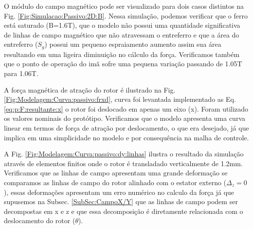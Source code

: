  O módulo do campo magnético pode ser visualizado para dois casos distintos na Fig. \ref{Fig:Simulacao:Passivo:2D:B}. Nessa simulação, podemos verificar que o ferro está saturado (B=1.6T), que o modelo não possui uma quantidade significativa de linhas de campo magnético que não atravessam o entreferro e que a área do entreferro ($S_g$) possui um pequeno espraiamento aumento assim sua área resultando em uma ligeira diminuição no cálculo da força. Verificamos também que o ponto de operação do imã sofre uma pequena variação passando de 1.05T para 1.06T.
%

A força magnética de atração do rotor é ilustrado na Fig. \ref{Fig:Modelagem:Curva:passivo:frxd}, 
curva foi levantada implementado as Eq. \eqref{eq:p:F:resultante:x}
o rotor foi deslocado em apenas um eixo (x). Foram utilizado os valores nominais do protótipo. Verificamos que o modelo apresenta uma curva linear em termos de força de atração por deslocamento, o que era desejado, já que implica em uma simplicidade no modelo e por consequência na malha de controle.


A Fig. \ref{Fig:Modelagem:Curva:passivo:dy:linhas} ilustra o resultado da simulação através de elementos finitos onde o rotor é transladado verticalmente de 1.2mm. Verificamos que as linhas de campo apresentam uma grande deformação se comparamos as linhas de campo do rotor alinhado com o estator externo ($\Delta_z = 0$), essas deformações apresentam um erro numérico no calculo da força já que supusemos na Subsec. \ref{SubSec:CampoX/Y} que as linhas de campo podem ser decompostas em x e z e que essa decomposição é diretamente relacionada com o deslocamento do rotor ($\theta$). 

